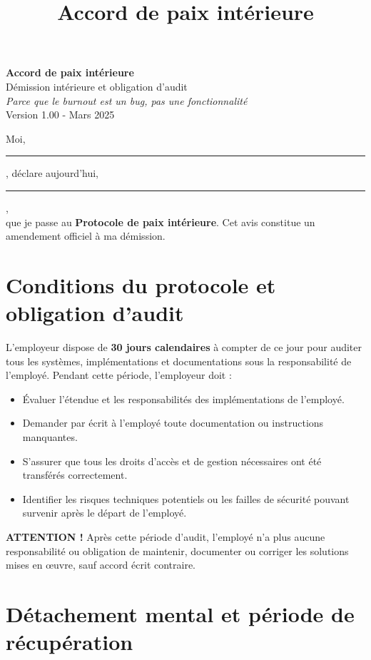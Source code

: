 \documentclass[a4paper,11pt]{article}
\title{Accord de paix intérieure}
\date{}
\begin{document}
\pagestyle{empty}

\begin{center}
    {\LARGE \textbf{Accord de paix intérieure}}\\[1em]
    {\large Démission intérieure et obligation d'audit}\\[0.5em]
    \textit{Parce que le burnout est un bug, pas une fonctionnalité}\\[0.5em]
    {\small Version 1.00 - Mars 2025}
\end{center}

\vspace{2em}

Moi, \rule{7cm}{0.2pt}, déclare aujourd'hui, \rule{4cm}{0.2pt},\\
que je passe au \textbf{Protocole de paix intérieure}. Cet avis constitue un amendement officiel à ma démission.

\section*{Conditions du protocole et obligation d'audit}

L'employeur dispose de \textbf{30 jours calendaires} à compter de ce jour pour auditer tous les systèmes, implémentations et documentations sous la responsabilité de l'employé. Pendant cette période, l'employeur doit :

\begin{itemize}
    \item Évaluer l'étendue et les responsabilités des implémentations de l'employé.
    \item Demander par écrit à l'employé toute documentation ou instructions manquantes.
    \item S'assurer que tous les droits d'accès et de gestion nécessaires ont été transférés correctement.
    \item Identifier les risques techniques potentiels ou les failles de sécurité pouvant survenir après le départ de l'employé.
\end{itemize}

\textbf{ATTENTION !} Après cette période d'audit, l'employé n'a plus aucune responsabilité ou obligation de maintenir, documenter ou corriger les solutions mises en œuvre, sauf accord écrit contraire.

\section*{Détachement mental et période de récupération}
\end{document}
